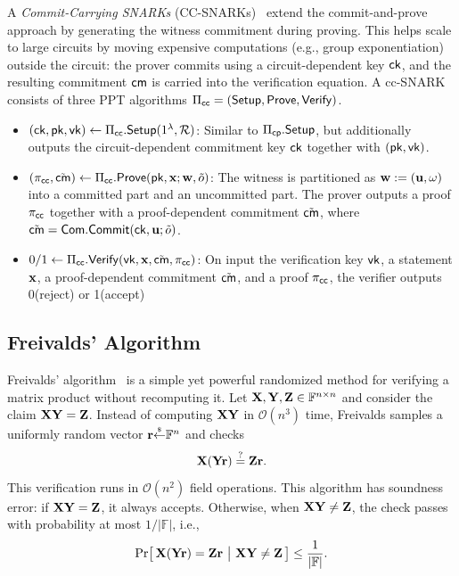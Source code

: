 \documentclass[letterpaper,twocolumn,10pt]{article}
\begin{document}
A \textit{Commit-Carrying SNARKs} (CC-SNARKs)~\cite{Legosnark, Vectis} extend the commit-and-prove approach by generating the witness commitment during proving. This helps scale to large circuits by moving expensive computations (e.g., group exponentiation) outside the circuit: the prover commits using a circuit-dependent key ${\sf ck}$, and the resulting commitment ${\sf cm}$ is carried into the verification equation. A cc-SNARK consists of three PPT algorithms $\Pi_{{\sf cc}}=({\sf Setup},{\sf Prove},{\sf Verify})$.

\begin{itemize}
    \item $({\sf ck}, {\sf pk}, {\sf vk}) \gets \Pi_{\sf cc}.{\sf Setup}(1^\lambda, {\mathcal{R}})$: Similar to $\Pi_{\sf cp}.{\sf Setup}$, but additionally outputs the circuit-dependent commitment key ${\sf ck}$ together with $({\sf pk},{\sf vk})$.
    \item $(\pi_{\sf cc}, \tilde{{\sf cm}}) \gets \Pi_{\sf cc}.{\sf Prove}({\sf pk}, {\mathbf{x}}; {\mathbf{w}}, \tilde{o})$: The witness is partitioned as ${\mathbf{w}} := ({\mathbf{u}},{\mathbf{\omega}})$ into a committed part and an uncommitted part.
    The prover outputs a proof $\pi_{\sf cc}$ together with a proof-dependent commitment $\tilde{{\sf cm}}$, where $\tilde{{\sf cm}} = {\sf Com}.{\sf Commit}({\sf ck}, {\mathbf{u}}; \tilde{o})$.
    \item $0/1 \gets \Pi_{\sf cc}.{\sf Verify}({\sf vk}, {\mathbf{x}}, \tilde{{\sf cm}}, \pi_{\sf cc})$: On input the verification key ${\sf vk}$, a statement ${\mathbf{x}}$, a proof-dependent commitment $\tilde{{\sf cm}}$, and a proof $\pi_{\sf cc}$, the verifier outputs 0(reject) or 1(accept)
\end{itemize}


\subsection{Freivalds’ Algorithm}
Freivalds' algorithm~\cite{Freivalds, Korec} is a simple yet powerful randomized method for verifying a matrix product without recomputing it.
Let \({\mathbf{X}},{\mathbf{Y}},{\mathbf{Z}}\in \mathbb{F}^{n\times n}\) and consider the claim \({\mathbf{X}}{\mathbf{Y}}={\mathbf{Z}}\).
Instead of computing \({\mathbf{X}}{\mathbf{Y}}\) in \(\mathcal{O}(n^3)\) time, Freivalds samples a uniformly random vector \(\mathbf{r}{\overset{{\scriptscriptstyle\$}}{\leftarrow}} \mathbb{F}^n\) and checks
\[
{\mathbf{X}}({\mathbf{Y}}\mathbf{r}) \stackrel{?}{=} {\mathbf{Z}}\mathbf{r}.
\]
This verification runs in \(\mathcal{O}(n^2)\) field operations. This algorithm has soundness error: if \({\mathbf{X}}{\mathbf{Y}}={\mathbf{Z}}\), it always accepts.
Otherwise, when \({\mathbf{X}}{\mathbf{Y}}\neq {\mathbf{Z}}\), the check passes with probability at most \(1/|\mathbb{F}|\), i.e.,
\[
\Pr\!\big[\,{\mathbf{X}}({\mathbf{Y}}\mathbf{r}) = {\mathbf{Z}}\mathbf{r}\ \big|\ {\mathbf{X}}{\mathbf{Y}}\neq {\mathbf{Z}}\,\big] \le \frac{1}{|\mathbb{F}|}.
\]
\end{document}
